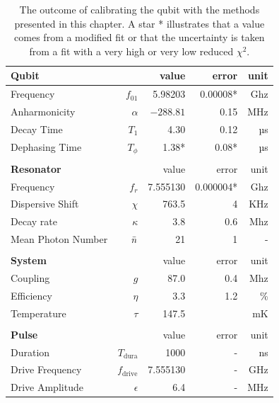 \begin{table}[h]
\centering
\caption{The outcome of calibrating the qubit with the methods presented in this chapter. A star * illustrates that a value comes from a modified fit or that the uncertainty is taken from a fit with a very high or very low reduced $\chi^2$. }
\begin{tabular}{lr|rrr}
\hline
\textbf{Qubit}                &          & value & error  & unit \\ \hline
Frequency                     & $f_{01}$ &  5.98203       &  0.00008* & Ghz  \\
Anharmonicity                 & $\alpha$ &  $-288.81$     &  0.15     & MHz  \\
Decay Time                    & $T_1$    &  4.30          &  0.12     & µs   \\
Dephasing Time                & $T_\phi$ &  1.38*         &  0.08*    & µs   \\ 
& & & & \\ \hline 

\textbf{Resonator}                &        & value      & error    & unit \\ \hline
Frequency                     & $f_{r}$    &  7.555130  & 0.000004*& Ghz  \\
Dispersive Shift              & $\chi$     &  763.5     &  4       & KHz \\
Decay rate                    & $\kappa$   &  3.8       & 0.6      & Mhz  \\
Mean Photon Number            & $\Bar{n}$  &  21        & 1        &  -  \\
 

& & & & \\ \hline 
\textbf{System}                &          & value & error & unit \\ \hline
Coupling                       & $g$      &  87.0         & 0.4    & Mhz  \\
Efficiency                     & $\eta$   &  3.3          & 1.2    & \% \\
Temperature                    & $\tau$   &  147.5        &        & mK \\
& & & & \\ \hline

\hline
\textbf{Pulse}                &                 & value      & error    & unit \\ \hline
Duration                      & $T_{\text{dura}}$  &  1000     & -        & ns   \\
Drive Frequency               & $f_{\text{drive}}$ &  7.555130 & -        & GHz  \\ 
Drive Amplitude               & $\epsilon$         &  6.4      & -        & MHz  \\ 
\end{tabular}
\label{tab:qubit_calibration}
\end{table}